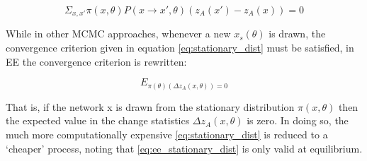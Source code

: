 \begin{equation}
\label{eq:stationary_dist}
\Sigma_{x,x'}\pi(x, \theta)P(x \rightarrow x', \theta)(z_A(x') - z_A(x)) = 0
\end{equation}

While in other MCMC approaches, whenever a new $x_s(\theta)$ is drawn, the convergence criterion given in equation \ref{eq:stationary_dist} must be satisfied, in EE the convergence criterion is rewritten:

\begin{equation}
\label{eq:ee_stationary_dist}
E_{\pi(\theta)(\Delta z_A(x, \theta)) = 0}
\end{equation}

That is, if the network x is drawn from the stationary distribution $\pi(x,\theta)$ then the expected value in the change statistics $\Delta z_A(x,\theta)$ is zero. In doing so, the much more computationally expensive \ref{eq:stationary_dist} is reduced to a `cheaper' process, noting that \ref{eq:ee_stationary_dist} is only valid at equilibrium. 

